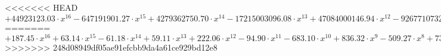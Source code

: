 <<<<<<< HEAD
$+44923123.03\cdot x^{16} -647191901.27\cdot x^{15} +4279362750.70\cdot x^{14} -17215003096.08\cdot x^{13} +47084000146.94\cdot x^{12} -92677107329.64\cdot x^{11} +135535435033.46\cdot x^{10} -149890502590.02\cdot x^{9} +126361098905.36\cdot x^{8} -81231850609.07\cdot x^{7} +39551053960.00\cdot x^{6} -14372130048.45\cdot x^{5} +3801935724.32\cdot x^{4} -703384607.42\cdot x^{3} +85140891.36\cdot x^{2} -5959234.05\cdot x^{1}  +178880.95$
=======
$+187.45\cdot x^{16} +63.14\cdot x^{15} -61.18\cdot x^{14} +59.11\cdot x^{13} +222.06\cdot x^{12} -94.90\cdot x^{11} -683.10\cdot x^{10} +836.32\cdot x^{9} -509.27\cdot x^{8} +731.06\cdot x^{7} -859.63\cdot x^{6} +377.97\cdot x^{5} +594.08\cdot x^{4} -1258.12\cdot x^{3} +1424.29\cdot x^{2} -827.17\cdot x^{1}  -3078.62$
>>>>>>> 248d08949df05ae91efcbb9da4a61ce929bd12e8
